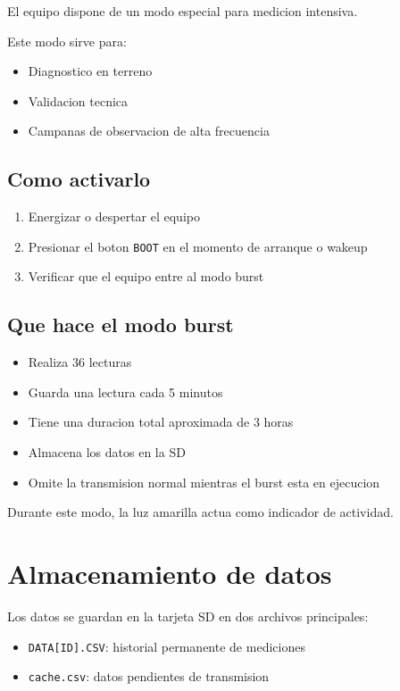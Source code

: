 \documentclass[11pt,a4paper]{article}
\begin{document}
El equipo dispone de un modo especial para medicion intensiva.

Este modo sirve para:

\begin{itemize}
  \item Diagnostico en terreno
  \item Validacion tecnica
  \item Campanas de observacion de alta frecuencia
\end{itemize}

\subsection{Como activarlo}

\begin{enumerate}
  \item Energizar o despertar el equipo
  \item Presionar el boton \texttt{BOOT} en el momento de arranque o wakeup
  \item Verificar que el equipo entre al modo burst
\end{enumerate}

\subsection{Que hace el modo burst}

\begin{itemize}
  \item Realiza 36 lecturas
  \item Guarda una lectura cada 5 minutos
  \item Tiene una duracion total aproximada de 3 horas
  \item Almacena los datos en la SD
  \item Omite la transmision normal mientras el burst esta en ejecucion
\end{itemize}

Durante este modo, la luz amarilla actua como indicador de actividad.

\section{Almacenamiento de datos}

Los datos se guardan en la tarjeta SD en dos archivos principales:

\begin{itemize}
  \item \texttt{DATA[ID].CSV}: historial permanente de mediciones
  \item \texttt{cache.csv}: datos pendientes de transmision
\end{itemize}
\end{document}
